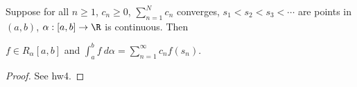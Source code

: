 \begin{theorem}[Rudin 6.16]
    Suppose for all \( n \geq 1  \), \( {c}_{n} \geq 0  \), \( \displaystyle \sum_{ n=1  }^{ N  } {c}_{n} \) converges, \( {s}_{1} < {s}_{2} < {s}_{3} < \cdots   \) are points in \( (a,b) \), \( \alpha:[a,b] \to \R  \) is continuous. Then
    \begin{center}
        \( f \in {R}_{\alpha}[a,b] \) and \( \displaystyle \int_{ a }^{ b } f  \ d \alpha = \displaystyle \sum_{ n=1  }^{ \infty  } {c}_{n} f({s}_{n})  \).
    \end{center}
\end{theorem}
\begin{proof}
See hw4.
\end{proof}

